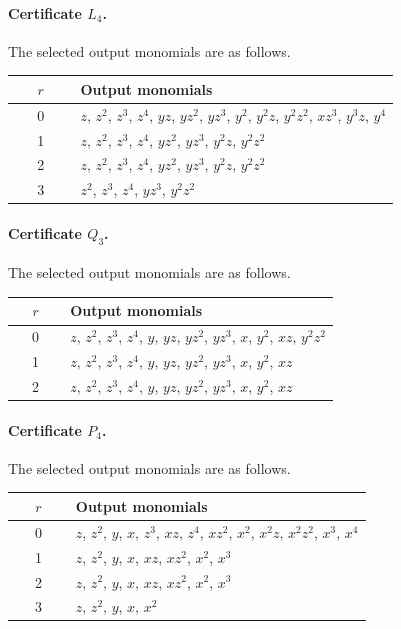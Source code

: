 \documentclass[11pt]{amsart}
\theoremstyle{definition}
\theoremstyle{remark}
\numberwithin{equation}{section}
\begin{document}
\paragraph{Certificate $L_4$.} The selected output monomials are as follows.
\begin{center}
\begin{tabular}{cp{0.83\linewidth}}
$r$ & Output monomials\\\hline
0 & \(z\), \(z^{2}\), \(z^{3}\), \(z^{4}\), \(yz\), \(yz^{2}\), \(yz^{3}\), \(y^{2}\), \(y^{2}z\), \(y^{2}z^{2}\), \(xz^{3}\), \(y^{3}z\), \(y^{4}\)\\
1 & \(z\), \(z^{2}\), \(z^{3}\), \(z^{4}\), \(yz^{2}\), \(yz^{3}\), \(y^{2}z\), \(y^{2}z^{2}\)\\
2 & \(z\), \(z^{2}\), \(z^{3}\), \(z^{4}\), \(yz^{2}\), \(yz^{3}\), \(y^{2}z\), \(y^{2}z^{2}\)\\
3 & \(z^{2}\), \(z^{3}\), \(z^{4}\), \(yz^{3}\), \(y^{2}z^{2}\)\\
\end{tabular}
\end{center}

\paragraph{Certificate $Q_3$.} The selected output monomials are as follows.
\begin{center}
\begin{tabular}{cp{0.83\linewidth}}
$r$ & Output monomials\\\hline
0 & \(z\), \(z^{2}\), \(z^{3}\), \(z^{4}\), \(y\), \(yz\), \(yz^{2}\), \(yz^{3}\), \(x\), \(y^{2}\), \(xz\), \(y^{2}z^{2}\)\\
1 & \(z\), \(z^{2}\), \(z^{3}\), \(z^{4}\), \(y\), \(yz\), \(yz^{2}\), \(yz^{3}\), \(x\), \(y^{2}\), \(xz\)\\
2 & \(z\), \(z^{2}\), \(z^{3}\), \(z^{4}\), \(y\), \(yz\), \(yz^{2}\), \(yz^{3}\), \(x\), \(y^{2}\), \(xz\)\\
\end{tabular}
\end{center}

\paragraph{Certificate $P_4$.} The selected output monomials are as follows.
\begin{center}
\begin{tabular}{cp{0.83\linewidth}}
$r$ & Output monomials\\\hline
0 & \(z\), \(z^{2}\), \(y\), \(x\), \(z^{3}\), \(xz\), \(z^{4}\), \(xz^{2}\), \(x^{2}\), \(x^{2}z\), \(x^{2}z^{2}\), \(x^{3}\), \(x^{4}\)\\
1 & \(z\), \(z^{2}\), \(y\), \(x\), \(xz\), \(xz^{2}\), \(x^{2}\), \(x^{3}\)\\
2 & \(z\), \(z^{2}\), \(y\), \(x\), \(xz\), \(xz^{2}\), \(x^{2}\), \(x^{3}\)\\
3 & \(z\), \(z^{2}\), \(y\), \(x\), \(x^{2}\)\\
\end{tabular}
\end{center}
\end{document}
